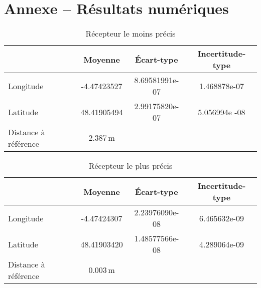 \section*{Annexe -- Résultats numériques}

   \begin{table}[h]
       \centering
       \begin{tabular}{l|ccc}
           \toprule
           \textbf{} & \textbf{Moyenne} & \textbf{Écart-type} & \textbf{Incertitude-type} \\
           \midrule
           Longitude & -4.47423527 & 8.69581991e-07 & 1.468878e-07 \\
           Latitude & 48.41905494 & 2.99175820e-07 & 5.056994e -08 \\
           \midrule
           Distance à référence & $2.387\, \mathrm{m}$ & & \\
           \bottomrule
       \end{tabular}
       \caption{Récepteur le moins précis}
       \label{tab:recept-pas-precis}
   \end{table}

    \begin{table}[h]
        \centering
        \begin{tabular}{l|ccc}
            \toprule
            \textbf{} & \textbf{Moyenne} & \textbf{Écart-type} & \textbf{Incertitude-type} \\
            \midrule
            Longitude & -4.47424307 & 2.23976090e-08 & 6.465632e-09 \\
            Latitude & 48.41903420 & 1.48577566e-08 & 4.289064e-09 \\
           \midrule
           Distance à référence & $0.003\, \mathrm{m}$ & & \\
            \bottomrule
        \end{tabular}
        \caption{Récepteur le plus précis}
        \label{tab:recept-precis}
    \end{table}

